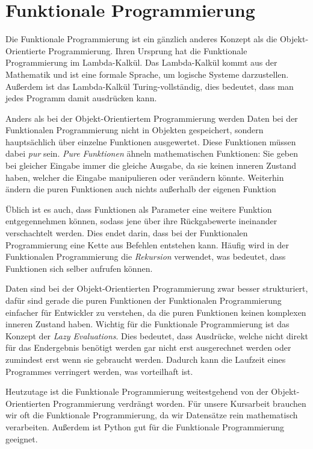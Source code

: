 \documentclass[]{dsadokumentation}
\begin{document}
\section{Funktionale Programmierung}
Die Funktionale Programmierung ist ein gänzlich anderes Konzept als die Objekt-Orientierte Programmierung. Ihren Ursprung hat die Funktionale Programmierung im Lambda-Kalkül. Das Lambda-Kalkül kommt aus der Mathematik und ist eine formale Sprache, um logische Systeme darzustellen. Außerdem ist das Lambda-Kalkül Turing-vollständig, dies bedeutet, dass man jedes Programm damit ausdrücken kann.

Anders als bei der Objekt-Orientiertem Programmierung werden Daten bei der Funktionalen Programmierung nicht in Objekten gespeichert, sondern hauptsächlich über einzelne Funktionen ausgewertet. Diese Funktionen müssen dabei \emph{pur} sein. \emph{Pure Funktionen} ähneln mathematischen Funktionen: Sie geben bei gleicher Eingabe immer die gleiche Ausgabe, da sie keinen inneren Zustand haben, welcher die Eingabe manipulieren oder verändern könnte. Weiterhin ändern die puren Funktionen auch nichts außerhalb der eigenen Funktion

Üblich ist es auch, dass Funktionen als Parameter eine weitere Funktion entgegennehmen können, sodass jene über ihre Rückgabewerte ineinander verschachtelt werden. Dies endet darin, dass bei der Funktionalen Programmierung eine Kette aus Befehlen entstehen kann. Häufig wird in der Funktionalen Programmierung die \emph{Rekursion} verwendet, was bedeutet, dass Funktionen sich selber aufrufen können.

Daten sind bei der Objekt-Orientierten Programmierung zwar besser strukturiert, dafür sind gerade die puren Funktionen der Funktionalen Programmierung einfacher für Entwickler zu verstehen, da die puren Funktionen keinen komplexen inneren Zustand haben. Wichtig für die Funktionale Programmierung ist das Konzept der \emph{Lazy Evaluations}. Dies bedeutet, dass Ausdrücke, welche nicht direkt für das Endergebnis benötigt werden gar nicht erst ausgerechnet werden oder zumindest erst wenn sie gebraucht werden. Dadurch kann die Laufzeit eines Programmes verringert werden, was vorteilhaft ist.

Heutzutage ist die Funktionale Programmierung weitestgehend von der Objekt-Orientierten Programmierung verdrängt worden. Für unsere Kursarbeit brauchen wir oft die Funktionale Programmierung, da wir Datensätze rein mathematisch verarbeiten. Außerdem ist Python gut für die Funktionale Programmierung geeignet.

\printbibliography{}
\end{document}

